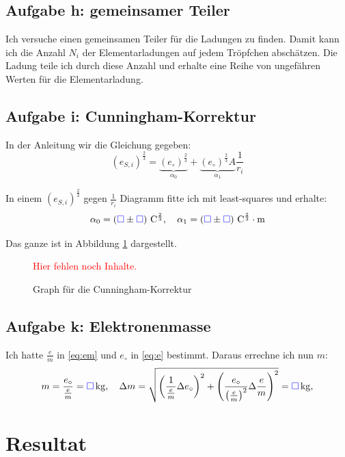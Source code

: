 \documentclass[11pt]{article}
\newcommand{\emesswert}{\left(\messwert \pm \messwert \right)}
\newcommand{\fehlt}{\textcolor{red}{Hier fehlen noch Inhalte.}}
\newcommand{\messwert}{\textcolor{blue}{\square}}
\begin{document}
\subsection{Aufgabe h: gemeinsamer Teiler}

Ich versuche einen gemeinsamen Teiler für die Ladungen zu finden. Damit kann
ich die Anzahl $N_i$ der Elementarladungen auf jedem Tröpfchen abschätzen. Die
Ladung teile ich durch diese Anzahl und erhalte eine Reihe von ungefähren
Werten für die Elementarladung.

\subsection{Aufgabe i: Cunningham-Korrektur}

In der Anleitung wir die Gleichung gegeben:
\[
	\left( e_{S, i} \right)^{\frac 23}
	= \underbrace{\left( e_\circ \right)^{\frac 23}}_{\alpha_0}
	+ \underbrace{\left( e_\circ \right)^{\frac 23} A}_{\alpha_1} \frac 1{r_i}
\]

In einem $\left( e_{S, i} \right)^{\frac 23}$ gegen $\frac 1{r_i}$ Diagramm
fitte ich mit least-squares und erhalte:
\[
	\alpha_0 = \unit[\emesswert]{C^{\frac 23}}
	, \quad
	\alpha_1 = \unit[\emesswert]{C^{\frac 23} \cdot m}
\]

Das ganze ist in Abbildung \ref{fig:cunningham} dargestellt.

\begin{figure}[h!]
	\centering
	\fehlt
	\caption{Graph für die Cunningham-Korrektur}
	\label{fig:cunningham}
\end{figure}

\subsection{Aufgabe k: Elektronenmasse}

Ich hatte $\frac em$ in \eqref{eq:em} und $e_\circ$ in \eqref{eq:e} bestimmt.
Daraus errechne ich nun $m$:
\[
	m = \frac{e_\circ}{\frac em} = \unit[\messwert]{kg},
	\quad
	\Delta m = \sqrt{
		\left(\frac{1}{\frac em} \Delta e_\circ \right)^2
		+ \left( \frac{e_\circ}{\left( \frac em \right)^2} \Delta \frac em \right)^2
	}
	= \unit[\messwert]{kg},
\]


\section{Resultat}
\end{document}
